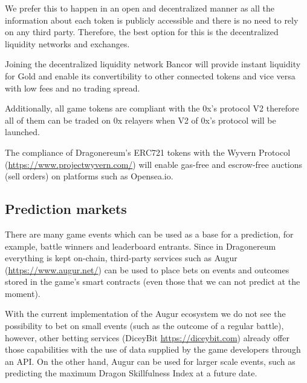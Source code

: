 \documentclass[12pt]{article}
\begin{document}
We prefer this to happen in an open and decentralized manner as all the information about each token is publicly accessible and there is no need to rely on any third party. Therefore, the best option for this is the decentralized liquidity networks and exchanges.\par

Joining the decentralized liquidity network Bancor will provide instant liquidity for Gold and enable its convertibility to other connected tokens and vice versa with low fees and no trading spread.\par

Additionally, all game tokens are compliant with the 0x’s protocol V2 therefore all of them can be traded on 0x relayers when V2 of 0x’s protocol will be launched.\par

The compliance of Dragonereum’s ERC721 tokens with the Wyvern Protocol (\url{https://www.projectwyvern.com/}) will enable gas-free and escrow-free auctions (sell orders) on platforms such as Opensea.io.\par


\vspace{\baselineskip}
\subsection{Prediction markets}\label{Prediction markets}\par

There are many game events which can be used as a base for a prediction, for example, battle winners and leaderboard entrants. Since in Dragonereum everything is kept on-chain, third-party services such as Augur (\url{https://www.augur.net/}) can be used to place bets on events and outcomes stored in the game’s smart contracts (even those that we can not predict at the moment).\par

With the current implementation of the Augur ecosystem we do not see the possibility to bet on small events (such as the outcome of a regular battle), however, other betting services (DiceyBit \url{https://diceybit.com}) already offer those capabilities with the use of data supplied by the game developers through an API. On the other hand, Augur can be used for larger scale events, such as predicting the maximum Dragon Skillfulness Index at a future date.\par


\vspace{\baselineskip}
\end{document}

